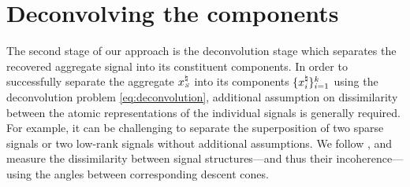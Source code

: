 \section{Deconvolving the components}\label{sec:3-3}

The second stage of our approach is the deconvolution stage which separates the recovered aggregate signal into its constituent components. In order to successfully separate the aggregate $x_{\scriptscriptstyle S}^{\natural}$ into its components $\{x_i^{\natural}\}_{i=1}^k$ using the deconvolution problem \eqref{eq:deconvolution}, additional assumption on dissimilarity between the atomic representations of the individual signals is generally required. For example, it can be challenging to separate the superposition of two sparse signals or two low-rank signals without additional assumptions. We follow \citet{mccoy2013achievable}, and measure the dissimilarity between signal structures---and thus their incoherence---using the angles between corresponding descent cones.

